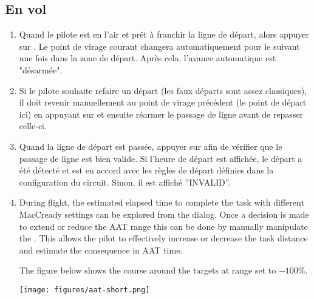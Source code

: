 \subsection*{En vol}
\begin{enumerate}
\item Quand le pilote est en l'air et prêt à franchir la ligne de départ, alors appuyer sur . Le point de virage courant changera automatiquement  pour le suivant une fois dans la zone de départ. Après cela, l'avance automatique est "désarmée".
\item  Si le pilote souhaite refaire un départ (les faux départs sont assez classiques), il doit revenir manuellement au point de virage précédent (le point de départ ici) en appuyant sur    et ensuite réarmer   le passage de ligne avant de repasser celle-ci.
\item  Quand la ligne de départ est passée, appuyer sur    afin de vérifier que le passage de ligne est bien valide. Si l'heure de départ est affichée, le départ a été détecté et est en accord avec les règles de départ définies dans la configuration du circuit. Sinon, il est affiché ''INVALID''.
\item  During flight, the estimated elapsed time to complete the task with
different MacCready settings can be explored from the  dialog.
Once a decision is made to extend or reduce the AAT range this can be done by
manually manipulate the . This allows the pilot to effectively increase or decrease the task
distance and estimate the consequence in AAT time.

The figure below shows the course around the targets at range set to $-100$\%.
\begin{center}
\texttt{[image: figures/aat-short.png]}
\end{center}


\end{enumerate}
